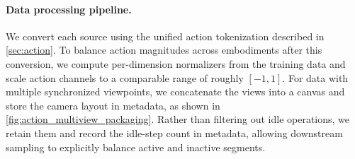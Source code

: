 \paragraph{Data processing pipeline.}
We convert each source using the unified action tokenization described in \cref{sec:action}. To balance action magnitudes across embodiments after this conversion, we compute per-dimension normalizers from the training data and scale action channels to a comparable range of roughly $[-1,1]$. For data with multiple synchronized viewpoints, we concatenate the views into a canvas and store the camera layout in metadata, as shown in \cref{fig:action_multiview_packaging}. Rather than filtering out idle operations, we retain them and record the idle-step count in metadata, allowing downstream sampling to explicitly balance active and inactive segments.
